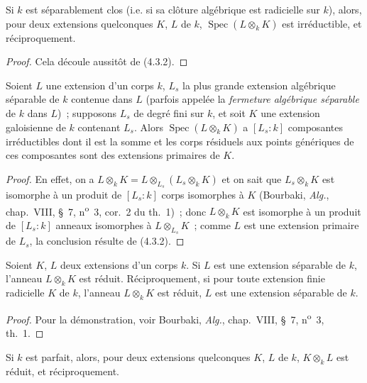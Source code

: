 \begin{corollary}[4.3.3]
\label{IV.2.4.3.3-fr}
Si $k$ est séparablement clos \textup{(i.e.} si sa clôture algébrique est radicielle sur
$k$\textup{)}, alors, pour deux extensions quelconques $K$, $L$ de $k$,
$\operatorname{Spec}(L\otimes_k K)$ est irréductible, et réciproquement.
\end{corollary}

\begin{proof}
Cela découle aussitôt de (4.3.2).
\end{proof}

\begin{corollary}[4.3.4]
\label{IV.2.4.3.4-fr}
Soient $L$ une extension d'un corps $k$, $L_s$ la plus grande extension
algébrique séparable de $k$ contenue dans $L$ \textup{(parfois appelée la
\emph{fermeture algébrique séparable} de $k$ dans $L$)}~; supposons $L_s$ de
degré fini sur $k$, et soit $K$ une extension galoisienne de $k$ contenant
$L_s$. Alors $\operatorname{Spec}(L\otimes_k K)$ a $[L_s:k]$ composantes
irréductibles dont il est la somme et les corps résiduels aux points génériques
de ces composantes sont des extensions primaires de $K$.
\end{corollary}

\begin{proof}
En effet, on a $L\otimes_k K=L\otimes_{L_s}(L_s\otimes_k K)$ et on sait que
$L_s\otimes_k K$ est isomorphe à un produit de $[L_s:k]$ corps isomorphes à
$K$ (Bourbaki, \emph{Alg.}, chap.~VIII, \S~7, n\textsuperscript{o}~3,
cor.~2 du th.~1)~; donc $L\otimes_k K$ est isomorphe à un produit de
$[L_s:k]$ anneaux isomorphes à $L\otimes_{L_s}K$~; comme $L$ est une
extension primaire de $L_s$, la conclusion résulte de (4.3.2).
\end{proof}

\begin{proposition}[4.3.5]
\label{IV.2.4.3.5-fr}
Soient $K$, $L$ deux extensions d'un corps $k$. Si $L$ est une extension
séparable de $k$, l'anneau $L\otimes_k K$ est réduit. Réciproquement, si pour
toute extension finie radicielle $K$ de $k$, l'anneau $L\otimes_k K$ est
réduit, $L$ est une extension séparable de $k$.
\end{proposition}

\begin{proof}
Pour la démonstration, voir Bourbaki, \emph{Alg.}, chap.~VIII, \S~7,
n\textsuperscript{o}~3, th.~1.
\end{proof}

\begin{corollary}[4.3.6]
\label{IV.2.4.3.6-fr}
Si $k$ est parfait, alors, pour deux extensions quelconques $K$, $L$ de $k$,
$K\otimes_k L$ est réduit, et réciproquement.
\end{corollary}

